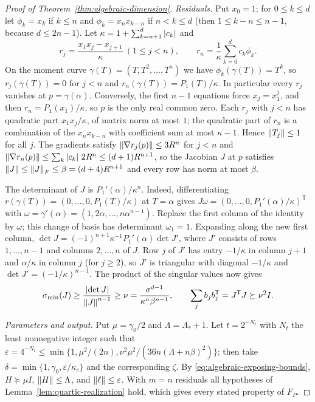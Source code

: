 \begin{proof}[Proof of Theorem~\ref{thm:algebraic-dimension}]
\emph{Residuals.} Put $x_0=1$; for $0\le k\le d$ let $\phi_k=x_k$ if $k\le n$
and $\phi_k=x_nx_{k-n}$ if $n<k\le d$ (then $1\le k-n\le n-1$, because
$d\le2n-1$). Let $\kappa=1+\sum_{k=n+1}^d\left\lvert c_k\right\rvert$ and
\[
 r_j=\frac{x_1x_j-x_{j+1}}{\kappa}\ (1\le j<n),\qquad
 r_n=\frac1\kappa\sum_{k=0}^dc_k\phi_k .
\]
On the moment curve $\gamma(T)=(T,T^2,\ldots,T^n)$ we have $\phi_k(\gamma(T))
=T^k$, so $r_j(\gamma(T))=0$ for $j<n$ and $r_n(\gamma(T))=P_1(T)/\kappa$. In
particular every $r_j$ vanishes at $p=\gamma(\alpha)$. Conversely, the first
$n-1$ equations force $x_j=x_1^j$, and then $r_n=P_1(x_1)/\kappa$, so $p$ is the
only real common zero. Each $r_j$ with $j<n$ has quadratic part
$x_1x_j/\kappa$, of matrix norm at most $1$; the quadratic part of $r_n$ is a
combination of the $x_nx_{k-n}$ with coefficient sum at most $\kappa-1$.
Hence $\left\lVert T_j\right\rVert\le1$ for all $j$. The gradients satisfy
$\left\lVert\nabla r_j(p)\right\rVert\le3R^n$ for $j<n$ and
$\left\lVert\nabla r_n(p)\right\rVert\le\sum_k\left\lvert c_k\right\rvert\,2R^n\le(d+1)R^{n+1}$, so the
Jacobian $J$ at $p$ satisfies $\left\lVert J\right\rVert\le\left\lVert J\right\rVert_F\le\beta=(d+4)R^{n+1}$ and
every row has norm at most $\beta$.

The determinant of $J$ is $P_1'(\alpha)/\kappa^n$. Indeed, differentiating
$r(\gamma(T))=(0,\ldots,0,P_1(T)/\kappa)$ at $T=\alpha$ gives
$J\omega=(0,\ldots,0,P_1'(\alpha)/\kappa)^{\mathsf T}$ with
$\omega=\gamma'(\alpha)=(1,2\alpha,\ldots,n\alpha^{n-1})$. Replace the first
column of the identity by $\omega$; this change of basis has determinant
$\omega_1=1$. Expanding along the new first column, $\det J=(-1)^{n+1}
\kappa^{-1}P_1'(\alpha)\det J'$, where $J'$ consists of rows $1,\ldots,n-1$ and
columns $2,\ldots,n$ of $J$. Row $j$ of $J'$ has entry $-1/\kappa$ in column
$j+1$ and $\alpha/\kappa$ in column $j$ (for $j\ge2$), so $J'$ is triangular
with diagonal $-1/\kappa$ and $\det J'=(-1/\kappa)^{n-1}$. The product of the
singular values now gives
\[
 \sigma_{\min}(J)\ge\frac{\left\lvert\det J\right\rvert}{\left\lVert J\right\rVert^{n-1}}\ge
 \nu=\frac{\sigma^{d-1}}{\kappa^n\beta^{n-1}},\qquad
 \sum_jb_jb_j^{\mathsf T}=J^{\mathsf T}J\succeq\nu^2I .
\]

\emph{Parameters and output.} Put $\mu=\gamma_0/2$ and $\Lambda=\Lambda_*+1$.
Let $t=2^{-N_t}$ with $N_t$ the least nonnegative integer such that
$\varepsilon=4^{-N_t}\le\min\{1,\mu^2/(2n),\nu^2\mu^2/(36n(\Lambda+n\beta)^2)\}$;
then take $\delta=\min\{1,\gamma_0,\varepsilon/\kappa_v\}$ and the corresponding
$\zeta$. By \eqref{eq:algebraic-exposing-bounds}, $H\succeq\mu I$,
$\left\lVert H\right\rVert\le\Lambda$, and $\left\lVert\ell\right\rVert\le\varepsilon$. With $m=n$ residuals all
hypotheses of Lemma~\ref{lem:quartic-realization} hold, which gives every
stated property of $F_P$.


\end{proof}
